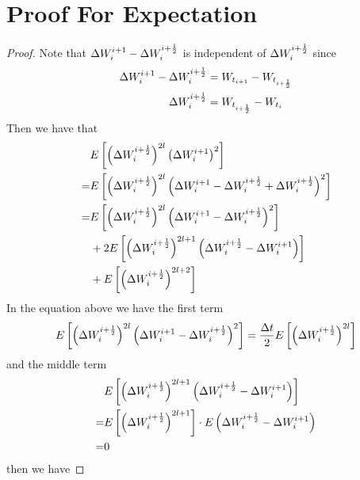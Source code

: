 \documentclass{homework}
\begin{document}
    \section{Proof For Expectation}
    \label{sec:proof for expectation}
    \begin{proof}
        Note that $\Delta W_{i}^{i+1}-\Delta W_{i}^{i+\frac{1}{2}}$ is independent of $\Delta W_{i}^{i+\frac{1}{2}}$ 
        since
        \[\begin{aligned}
            \Delta W_{i}^{i+1}-\Delta W_{i}^{i+\frac{1}{2}}&=W_{t_{i+1}}-W_{t_{i+\frac{1}{2}}}\\
            \Delta W_{i}^{i+\frac{1}{2}}&=W_{t_{i+\frac{1}{2}}}-W_{t_i}
        \end{aligned}\]
        Then we have that
        \[\begin{aligned}
            &E\left[
            \left(\Delta W_{i}^{i+\frac{1}{2}}\right)^{2l}
            \left(\Delta W_{i}^{i+1}\right)^2
            \right]\\
            =&E\left[
            \left(\Delta W_{i}^{i+\frac{1}{2}}\right)^{2l}
            \left(\Delta W_{i}^{i+1}-\Delta W_{i}^{i+\frac{1}{2}}+\Delta W_{i}^{i+\frac{1}{2}}\right)^2
            \right]\\
            =&\begin{aligned}[t]
            &E\left[
            \left(\Delta W_{i}^{i+\frac{1}{2}}\right)^{2l}\left(\Delta W_{i}^{i+1}-\Delta W_{i}^{i+\frac{1}{2}}\right)^2
            \right]\\
            &+2E\left[
            \left(\Delta W_{i}^{i+\frac{1}{2}}\right)^{2l+1}\left(\Delta W_{i}^{i+\frac{1}{2}}-\Delta W_{i}^{i+1}\right)
            \right]\\
            &+E\left[\left(\Delta W_{i}^{i+\frac{1}{2}}\right)^{2l+2}\right]\\
            \end{aligned}\\
        \end{aligned}\]
        In the equation above we have the first term
        \[\begin{aligned}
            E\left[
            \left(\Delta W_{i}^{i+\frac{1}{2}}\right)^{2l}\left(\Delta W_{i}^{i+1}-\Delta W_{i}^{i+\frac{1}{2}}\right)^2
            \right]
            =\frac{\Delta t}{2}E\left[\left(\Delta W_{i}^{i+\frac{1}{2}}\right)^{2l}\right]
        \end{aligned}\]
        and the middle term
        \[\begin{aligned}
            &E\left[\left(\Delta W_{i}^{i+\frac{1}{2}}\right)^{2l+1}\left(\Delta W_{i}^{i+\frac{1}{2}}-\Delta W_{i}^{i+1}\right)\right]\\
            =&
            E\left[\left(\Delta W_{i}^{i+\frac{1}{2}}\right)^{2l+1}\right]
            \cdot E\left(\Delta W_{i}^{i+\frac{1}{2}}-\Delta W_{i}^{i+1}\right)\\
            =&0\\
        \end{aligned}\]
        then we have
        \renewcommand{\theequation}{A.\arabic{equation}}

\end{proof}
\end{document}
